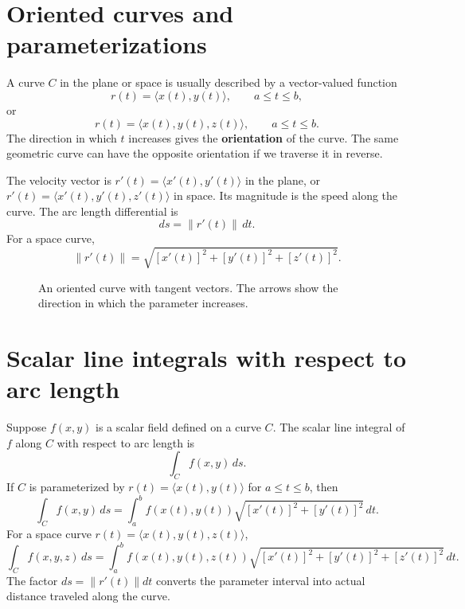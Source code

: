 \documentclass[11pt,oneside]{book}
\newcommand{\norm}[1]{\left\lVert #1\right\rVert}
\begin{document}
\section{Oriented curves and parameterizations}

A curve $C$ in the plane or space is usually described by a vector-valued function
\[
r(t)=\langle x(t),y(t)\rangle,\qquad a\le t\le b,
\]
or
\[
r(t)=\langle x(t),y(t),z(t)\rangle,\qquad a\le t\le b.
\]
The direction in which $t$ increases gives the \textbf{orientation} of the curve. The same geometric curve can have the opposite orientation if we traverse it in reverse.

The velocity vector is $r'(t)=\langle x'(t),y'(t)\rangle$ in the plane, or $r'(t)=\langle x'(t),y'(t),z'(t)\rangle$ in space. Its magnitude is the speed along the curve. The arc length differential is
\[
ds=\norm{r'(t)}\,dt.
\]
For a space curve,
\[
\norm{r'(t)}=\sqrt{[x'(t)]^2+[y'(t)]^2+[z'(t)]^2}.
\]

\begin{figure}[H]
\centering
{}
\caption{An oriented curve with tangent vectors. The arrows show the direction in which the parameter increases.}
\end{figure}

\section{Scalar line integrals with respect to arc length}

Suppose $f(x,y)$ is a scalar field defined on a curve $C$. The scalar line integral of $f$ along $C$ with respect to arc length is
\[
\int_C f(x,y)\,ds.
\]
If $C$ is parameterized by $r(t)=\langle x(t),y(t)\rangle$ for $a\le t\le b$, then
\[
\int_C f(x,y)\,ds
=
\int_a^b f(x(t),y(t))\sqrt{[x'(t)]^2+[y'(t)]^2}\,dt.
\]
For a space curve $r(t)=\langle x(t),y(t),z(t)\rangle$,
\[
\int_C f(x,y,z)\,ds
=
\int_a^b f(x(t),y(t),z(t))\sqrt{[x'(t)]^2+[y'(t)]^2+[z'(t)]^2}\,dt.
\]
The factor $ds=\norm{r'(t)}dt$ converts the parameter interval into actual distance traveled along the curve.
\end{document}
